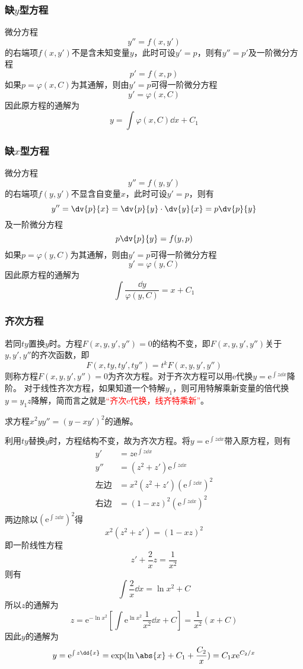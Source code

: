 \subsubsection{缺\texorpdfstring{$y$}{y}型方程}
微分方程
\[ y'' = f(x,y') \]
的右端项$f(x,y')$不是含未知变量$y$，此时可设$y'=p$，则有$y''=p'$及一阶微分方程
\[ p' = f(x,p) \]
如果$p=\varphi(x,C)$为其通解，则由$y'=p$可得一阶微分方程
\[ y' = \varphi(x,C) \]
因此原方程的通解为
\[ y = \int \varphi(x,C)\dd{x} + C_1 \]

\subsubsection{缺\texorpdfstring{$x$}{x}型方程}
微分方程
\[ y'' = f(y,y') \]
的右端项$f(y,y')$不显含自变量$x$，此时可设$y'=p$，则有
\[ y'' = \dv{p}{x}=\dv{p}{y}\cdot\dv{y}{x} = p\dv{p}{y} \]
及一阶微分方程
\[ p\dv{p}{y} = f(y,p) \]
如果$p=\varphi(y,C)$为其通解，则由$y'=p$可得一阶微分方程
\[ y' = \varphi(y,C) \]
因此原方程的通解为
\[ \int \frac{\dd{y}}{\varphi(y,C)} = x + C_1 \]

\subsubsection{齐次方程}
若同$ty$置换$y$时。方程$F(x,y,y',y'')=0$的结构不变，即$F(x,y,y',y'')$关于$y,y',y''$的齐次函数，即
\[ F(x,ty,ty',ty'') = t^k F(x,y,y',y'') \]
则称方程$F(x,y,y',y'')=0$为齐次方程。对于齐次方程可以用$\mathrm{e}$代换$y = \mathrm{e}^{\int z\dd{x}}$降阶。
对于线性齐次方程，如果知道一个特解$y_1$，则可用特解乘新变量的倍代换$y=y_1z$降解，简而言之就是\textcolor{red}{“齐次$\mathrm{e}$代换，线齐特乘新”}。

\begin{example}
    求方程$x^2yy''=(y-xy')^2$的通解。
\end{example}
\begin{solution}
    利用$ty$替换$y$时，方程结构不变，故为齐次方程。将$y=\mathrm{e}^{\int z\dd{x}}$带入原方程，则有
    \begin{align*}
        y'          & = z\mathrm{e}^{\int z\dd{x}}                          \\
        y''         & = (z^2+z')\mathrm{e}^{\int z\dd{x}}                   \\
        \text{左边} & = x^2(z^2+z')\left(\mathrm{e}^{\int z\dd{x}}\right)^2 \\
        \text{右边} & = (1-xz)^2\left(\mathrm{e}^{\int z\dd{x}}\right)^2
    \end{align*}
    两边除以$\left(\mathrm{e}^{\int z\dd{x}}\right)^2$得
    \[ x^2(z^2+z') = (1-xz)^2 \]
    即一阶线性方程
    \[ z' + \frac{2}{x}z = \frac{1}{x^2} \]
    则有
    \[ \int \frac{2}{x}\dd{x} = \ln{x^2} + C \]
    所以$z$的通解为
    \[
        z =\mathrm{e}^{-\ln{x^2}}\left[\int \mathrm{e}^{\ln{x^2}} \frac{1}{x^2}\dd{x} + C \right]
        =\frac{1}{x^2}(x + C)
    \]
    因此$y$的通解为
    \[ y = \mathrm{e}^{\int z \dd{x}} = \exp(\ln\abs{x} + C_1 + \frac{C_2}{x}) = C_1x\mathrm{e}^{C_2/x} \]
\end{solution}

